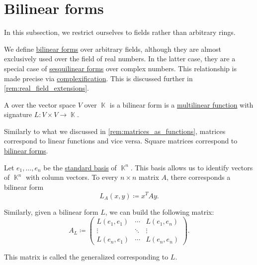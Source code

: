 \section{Bilinear forms}\label{sec:bilinear_forms}

In this subsection, we restrict ourselves to fields rather than arbitrary rings.

We define \hyperref[def:bilinear_form]{bilinear forms} over arbitrary fields, although they are almost exclusively used over the field of real numbers. In the latter case, they are a special case of \hyperref[def:sesquilinear_form]{sesquilinear forms} over complex numbers. This relationship is made precise via \hyperref[def:complexification]{complexification}. This is discussed further in \cref{rem:real_field_extensions}.

\begin{definition}\label{def:bilinear_form}
  A  over the vector space \( V \) over \( \BbbK \) is a bilinear form is a \hyperref[def:multilinear_function]{multilinear function} with signature \( L: V \times V \to \BbbK \).
\end{definition}

\begin{remark}\label{rem:matrices_as_bilinear_forms}
  Similarly to what we discussed in \cref{rem:matrices_as_functions}, matrices correspond to linear functions and vice versa. Square matrices correspond to \hyperref[def:bilinear_form]{bilinear forms}.

  Let \( e_1, \ldots, e_n \) be the \hyperref[def:coordinate_space]{standard basis} of \( \BbbK^n \). This basis allows us to identify vectors of \( \BbbK^n \) with column vectors. To every \( n \times n \) matrix \( A \), there corresponds a bilinear form
  \begin{equation*}
    L_A(x, y) \coloneqq x^T A y.
  \end{equation*}

  Similarly, given a bilinear form \( L \), we can build the following matrix:
  \begin{equation*}
    A_L \coloneqq
    \begin{pmatrix}
      L(e_1, e_1) & \cdots & L(e_1, e_n) \\
      \vdots      & \ddots & \vdots      \\
      L(e_n, e_1) & \cdots & L(e_n, e_n)
    \end{pmatrix}.
  \end{equation*}

  This matrix is called the generalized  corresponding to \( L \).
\end{remark}

